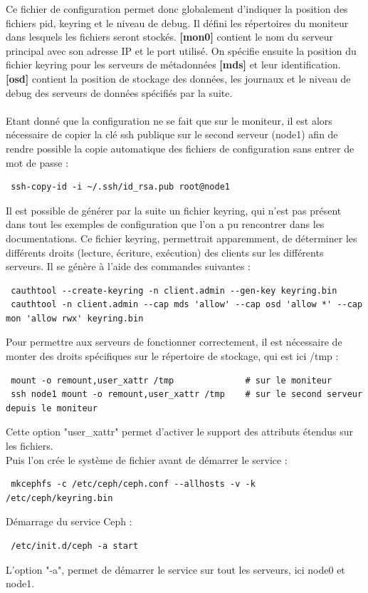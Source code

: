 \documentclass[12pt]{report}
\begin{document}
                        Ce fichier de configuration permet donc globalement d'indiquer la position des fichiers pid, keyring et le niveau de debug. Il défini les répertoires du moniteur dans lesquels les fichiers seront stockés. \textbf{[mon0]} contient le nom du serveur principal avec son adresse IP et le port utilisé. On spécifie ensuite la position du fichier keyring pour les serveurs de métadonnées \textbf{[mds]} et leur identification. \textbf{[osd]} contient la position de stockage des données, les journaux et le niveau de debug des serveurs de données spécifiés par la suite.\\\\
                        Etant donné que la configuration ne se fait que sur le moniteur, il est alors nécessaire de copier la clé ssh publique sur le second serveur (node1) afin de rendre possible la copie automatique des fichiers de configuration sans entrer de mot de passe :
                        \begin{lstlisting}
 ssh-copy-id -i ~/.ssh/id_rsa.pub root@node1
                        \end{lstlisting}
                        Il est possible de générer par la suite un fichier keyring, qui n'est pas présent dans tout les exemples de configuration que l'on a pu rencontrer dans les documentations. Ce fichier keyring, permettrait apparemment, de déterminer les différents droits (lecture, écriture, exécution) des clients sur les différents serveurs. Il se génère à l'aide des commandes suivantes :
                        \begin{lstlisting}
 cauthtool --create-keyring -n client.admin --gen-key keyring.bin
 cauthtool -n client.admin --cap mds 'allow' --cap osd 'allow *' --cap mon 'allow rwx' keyring.bin
                        \end{lstlisting}
                        Pour permettre aux serveurs de fonctionner correctement, il est nécessaire de monter des droits spécifiques sur le répertoire de stockage, qui est ici /tmp :
                        \begin{lstlisting}
 mount -o remount,user_xattr /tmp              # sur le moniteur
 ssh node1 mount -o remount,user_xattr /tmp    # sur le second serveur depuis le moniteur
                        \end{lstlisting}
                        Cette option "user\_xattr" permet d'activer le support des attributs étendus sur les fichiers.\\
                        Puis l'on crée le système de fichier avant de démarrer le service :
                        \begin{lstlisting}
 mkcephfs -c /etc/ceph/ceph.conf --allhosts -v -k /etc/ceph/keyring.bin
                        \end{lstlisting}
                        Démarrage du service Ceph :
                        \begin{lstlisting}
 /etc/init.d/ceph -a start
                        \end{lstlisting}
                        L'option "-a", permet de démarrer le service sur tout les serveurs, ici node0 et node1.\\
                        
\end{document}
